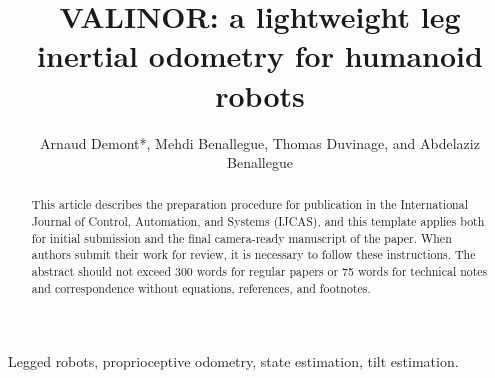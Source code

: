 \documentclass{IJCAS}
\begin{document}
\newcommand{\getErrorResult}[5]{\csname#1#2#3#4#5\endcsname}



\title{VALINOR: a lightweight leg inertial odometry for humanoid robots}

\author{Arnaud Demont*, Mehdi Benallegue, Thomas Duvinage, and Abdelaziz Benallegue}

\begin{abstract}
This article describes the preparation procedure for publication in the International Journal of Control, Automation, and Systems (IJCAS), and this template applies both for initial submission and the final camera-ready manuscript of the paper. When authors submit their work for review, it is necessary to follow these instructions. The abstract should not exceed 300 words for regular papers or 75 words for technical notes and correspondence without equations, references, and footnotes.
\end{abstract}

\begin{keywords}
  Legged robots, proprioceptive odometry, state estimation, tilt estimation.
\end{keywords}

\maketitle

\end{document}
